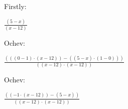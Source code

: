\documentclass[12pt]{article}
\begin{document}
Firstly: 
\begin{center}
$ \frac{(5 - x)}{(x - 12)} $
\end{center}
Ochev: 
\begin{center}
$ \frac{(((0 - 1) \cdot (x - 12)) - ((5 - x) \cdot (1 - 0)))}{((x - 12) \cdot (x - 12))} $
\end{center}
Ochev: 
\begin{center}
$ \frac{((-1 \cdot (x - 12)) - (5 - x))}{((x - 12) \cdot (x - 12))} $
\end{center}
\end{document}
